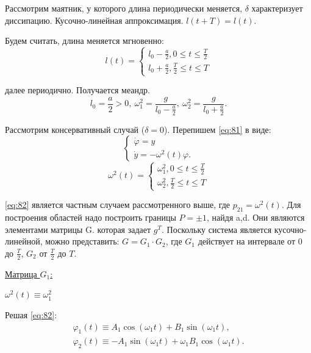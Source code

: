 Рассмотрим маятник, у которого длина периодически меняется, $\delta$ характеризует диссипацию. Кусочно-линейная аппроксимация. $l(t+T)=l(t)$.

Будем считать, длина меняется мгновенно:
\begin{equation*}
	l(t)=
	\left\{\begin{aligned}
		l_0-\frac{a}{2}, 0 \leq t \leq \frac{T}{2} \\
		l_0+\frac{a}{2}, \frac{T}{2} \leq t \leq T		
	\end{aligned}\right.
\end{equation*}

далее периодично. Получается меандр.
\begin{equation*}
	l_0=\frac{a}{2}>0,~\omega_1^2=\frac{g}{l_0-\frac{a}{2}},~\omega_2^2=\frac{g}{l_0+\frac{a}{2}}.
\end{equation*}

Рассмотрим консервативный случай ($\delta=0$). Перепишем \eqref{eq:81} в виде:
\begin{equation}
	\left\{\begin{aligned}
		\dot{\varphi}=y \\
		\dot{y} =-\omega^2(t)\varphi.	
	\end{aligned}\right.
	\label{eq:82}
\end{equation}
\begin{equation}
	\omega^2(t)=
	\left\{\begin{aligned}
		\omega^2_1, 0 \leq t \leq \frac{T}{2} \\
		\omega^2_2, \frac{T}{2} \leq t \leq T		
	\end{aligned}\right.
	\label{eq:83}	
\end{equation}

\eqref{eq:82} является частным случаем рассмотренного выше, где $p_{21}=\omega^2(t)$. Для построения областей надо построить границы $P=\pm 1$, найдя a,d. Они являются элементами матрицы G. которая задает $g^T$. Поскольку система является кусочно-линейной, можно представить: $G=G_1\cdot G_2$, где $G_1$ действует на интервале от 0 до $\frac{T}{2}$, $G_2$ от $\frac{T}{2}$ до $T$. 

\underline{Матрица $G_1$:}

$\omega^2(t)\equiv\omega_1^2$

Решая \eqref{eq:82}:
\begin{gather*}
	\varphi_1(t)\equiv A_1 \cos(\omega_1 t) + B_1\sin(\omega_1 t), \\
	\varphi_2(t)\equiv -A_1 \sin(\omega_1 t) + \omega_1 B_1\cos(\omega_1 t).
\end{gather*}

